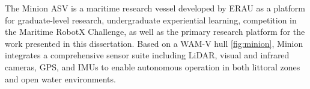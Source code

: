 \documentclass{erauthesis}
\begin{document}





The Minion \Ac{ASV} is a maritime research vessel developed by \ac{ERAU} as a platform for graduate-level research, undergraduate experiential learning, competition in the Maritime RobotX Challenge, as well as the primary research platform for the work presented in this dissertation. 
Based on a \ac{WAM-V} hull \ref{fig:minion}, Minion integrates a comprehensive sensor suite including \ac{LiDAR}, visual and infrared cameras, \ac{GPS}, and \acp{IMU} to enable autonomous operation in both littoral zones and open water environments.
\end{document}
